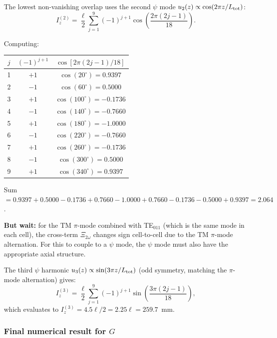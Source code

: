 \documentclass[12pt,aps,prd,twocolumn,superscriptaddress,nofootinbib]{revtex4-2}
\begin{document}
The lowest non-vanishing overlap uses the second $\psi$ mode
$u_2(z) \propto \cos(2\pi z/L_{\rm tot})$:
\begin{equation}
I_z^{(2)} = \frac{\ell}{2}\sum_{j=1}^{9}(-1)^{j+1}
\cos\!\left(\frac{2\pi(2j-1)}{18}\right).
\label{eq:I_z2}
\end{equation}

Computing:
\begin{center}
\begin{tabular}{ccc}
\toprule
$j$ & $(-1)^{j+1}$ & $\cos[2\pi(2j-1)/18]$ \\
\midrule
1 & $+1$ & $\cos(20^\circ) = 0.9397$ \\
2 & $-1$ & $\cos(60^\circ) = 0.5000$ \\
3 & $+1$ & $\cos(100^\circ) = -0.1736$ \\
4 & $-1$ & $\cos(140^\circ) = -0.7660$ \\
5 & $+1$ & $\cos(180^\circ) = -1.0000$ \\
6 & $-1$ & $\cos(220^\circ) = -0.7660$ \\
7 & $+1$ & $\cos(260^\circ) = -0.1736$ \\
8 & $-1$ & $\cos(300^\circ) = 0.5000$ \\
9 & $+1$ & $\cos(340^\circ) = 0.9397$ \\
\bottomrule
\end{tabular}
\end{center}

Sum $= 0.9397 + 0.5000 - 0.1736 + 0.7660 - 1.0000 + 0.7660
- 0.1736 - 0.5000 + 0.9397 = 2.064$.

\textbf{But wait:} for the TM $\pi$-mode combined with TE$_{011}$
(which is the same mode in each cell), the cross-term
$\Xi_{2\omega}$ changes sign cell-to-cell due to the TM
$\pi$-mode alternation.  For this to couple to a $\psi$ mode, the
$\psi$ mode must also have the appropriate axial structure.

The third $\psi$ harmonic $u_3(z) \propto \sin(3\pi z/L_{\rm tot})$
(odd symmetry, matching the $\pi$-mode alternation) gives:
\begin{equation}
I_z^{(3)} = \frac{\ell}{2}\sum_{j=1}^{9}(-1)^{j+1}
\sin\!\left(\frac{3\pi(2j-1)}{18}\right),
\label{eq:I_z3}
\end{equation}
which evaluates to $I_z^{(3)} = 4.5\ell/2 = 2.25\ell = 259.7$~mm.

\subsubsection{Final numerical result for $G$}
\end{document}

